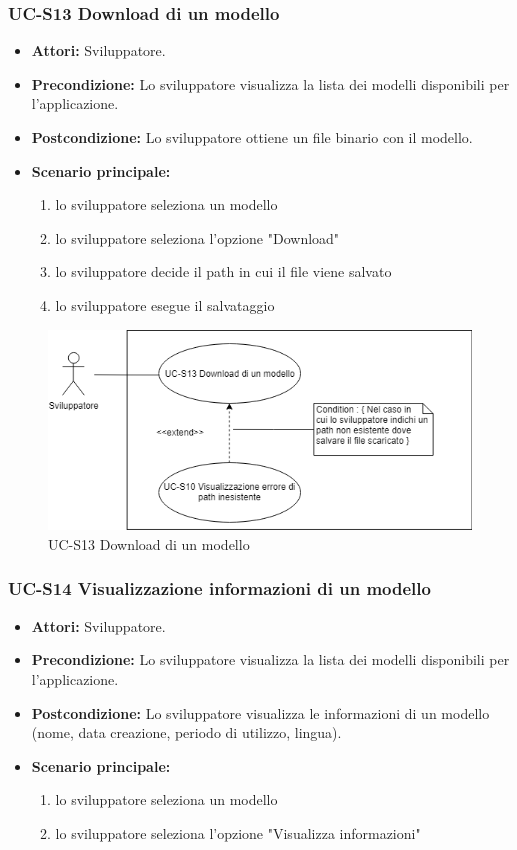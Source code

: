 	\subsubsection{UC-S13 Download di un modello}
		\begin{itemize}
			\item \textbf{Attori:} Sviluppatore.
			\item \textbf{Precondizione:} Lo sviluppatore visualizza la lista dei modelli disponibili per l'applicazione.
			\item \textbf{Postcondizione:} Lo sviluppatore ottiene un file binario con il modello.
			\item \textbf{Scenario principale:}
			\begin{enumerate}
				\item lo sviluppatore seleziona un modello
				\item lo sviluppatore seleziona l'opzione "Download"
				\item lo sviluppatore decide il path in cui il file viene salvato
				\item lo sviluppatore esegue il salvataggio
			\end{enumerate}
		\end{itemize}	
		
		\begin{figure}[h]
		\centering
		\includegraphics[scale=0.7]{images/UC-S13.png}
		\caption{UC-S13 Download di un modello}
		\end{figure}

	\subsubsection{UC-S14 Visualizzazione informazioni di un modello}
		\begin{itemize}
			\item \textbf{Attori:} Sviluppatore.
			\item \textbf{Precondizione:} Lo sviluppatore visualizza la lista dei modelli disponibili per l'applicazione.
			\item \textbf{Postcondizione:} Lo sviluppatore visualizza le informazioni di un modello (nome, data creazione, periodo di utilizzo, lingua).
			\item \textbf{Scenario principale:}
			\begin{enumerate}
				\item lo sviluppatore seleziona un modello
				\item lo sviluppatore seleziona l'opzione "Visualizza informazioni"
				\end{enumerate}
		\end{itemize}
		
